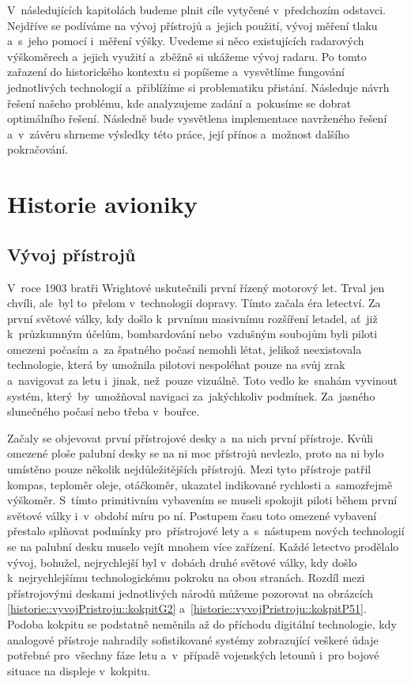 	V~následujících kapitolách budeme plnit cíle vytyčené v~předchozím odstavci. Nejdříve se podíváme na vývoj přístrojů a~jejich použití, vývoj měření tlaku a~s~jeho pomocí i~měření výšky. Uvedeme si něco existujících radarových výškoměrech a~jejich využití a~zběžně si ukážeme vývoj radaru.
	Po tomto zařazení do historického kontextu si popíšeme a~vysvětlíme fungování jednotlivých technologií a~přiblížíme si problematiku přistání.
	Následuje návrh řešení našeho problému, kde analyzujeme zadání a~pokusíme se dobrat optimálního řešení. Následně bude vysvětlena implementace navrženého řešení a~v~závěru shrneme výsledky této práce, její přínos a~možnost dalšího pokračování.

\chapter{Historie avioniky}
	\section{Vývoj přístrojů}
	
		V~roce 1903 bratři Wrightové uskutečnili první řízený motorový let. Trval jen chvíli, ale~byl to~přelom v~technologii dopravy. Tímto začala éra letectví. Za první světové války, kdy došlo k~prvnímu masivnímu rozšíření letadel,  ať~již k~průzkumným účelům, bombardování nebo~vzdušným soubojům byli piloti omezeni počasím a~za špatného počasí nemohli létat, jelikož neexistovala technologie, která by umožnila pilotovi nespoléhat pouze na svůj zrak a~navigovat za letu i~jinak, než~pouze vizuálně. Toto vedlo ke~snahám vyvinout systém, který~by~umožňoval navigaci za~jakýchkoliv podmínek. Za~jasného slunečného počasí nebo třeba v~bouřce.\par
		
		Začaly se objevovat první přístrojové desky a~na nich první přístroje. Kvůli omezené ploše palubní desky se na ni moc přístrojů nevlezlo, proto na ni bylo umístěno pouze několik nejdůležitějších přístrojů. Mezi tyto přístroje patřil kompas, teploměr oleje, otáčkoměr, ukazatel indikované rychlosti a~samozřejmě výškoměr. S~tímto primitivním vybavením se museli spokojit piloti během první světové války i~v~období míru po ní. Postupem času toto omezené vybavení přestalo splňovat podmínky pro~přístrojové lety a~s~nástupem nových technologií se na palubní desku muselo vejít mnohem více zařízení. Každé letectvo prodělalo vývoj, bohužel, nejrychlejší byl v~dobách druhé světové války, kdy došlo k~nejrychlejšímu technologickému pokroku na obou stranách. Rozdíl mezi přístrojovými deskami jednotlivých národů můžeme pozorovat na obrázcích \ref{historie::vyvojPristroju::kokpitG2} a~\ref{historie::vyvojPristroju::kokpitP51}.
		Podoba kokpitu se podstatně neměnila až do příchodu digitální technologie, kdy analogové přístroje nahradily sofistikované systémy zobrazující veškeré údaje potřebné pro~všechny fáze letu a~v~případě vojenských letounů i~pro bojové situace na displeje v~kokpitu. 
		
